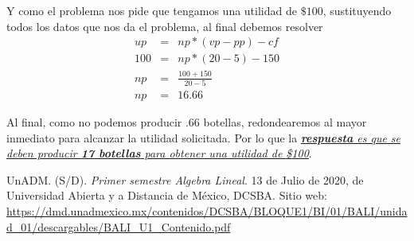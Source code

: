 \documentclass[12pt]{article}
\begin{document}
\begin{itemize}
\begin{multicols}{2}
			\par Y como el problema nos pide que tengamos una utilidad de $\$100$, sustituyendo todos los datos que nos da el problema, al final debemos resolver
			\begin{eqnarray*}
				up &=& np*(vp - pp) - cf \\
				100 &=& np*(20 - 5) - 150 \\
				np &=& \frac{100 + 150}{20 - 5} \\
				np &=& 16.66
			\end{eqnarray*}
			
			\par Al final, como no podemos producir $.66$ botellas, redondearemos al mayor inmediato para alcanzar la utilidad solicitada. Por lo que la \emph{\ul{\textbf{respuesta} es que se deben producir \textbf{17 botellas} para obtener una utilidad de {\$}100}}.
		\end{multicols}
	\end{itemize}


\newpage
\begin{thebibliography}{X}
	 UnADM. (S/D). \textit{Primer semestre Algebra Lineal}. 13 de Julio de 2020, de Universidad Abierta y a Distancia de México, DCSBA. Sitio web: \url{https://dmd.unadmexico.mx/contenidos/DCSBA/BLOQUE1/BI/01/BALI/unidad_01/descargables/BALI_U1_Contenido.pdf}
\end{thebibliography}
\end{document}
